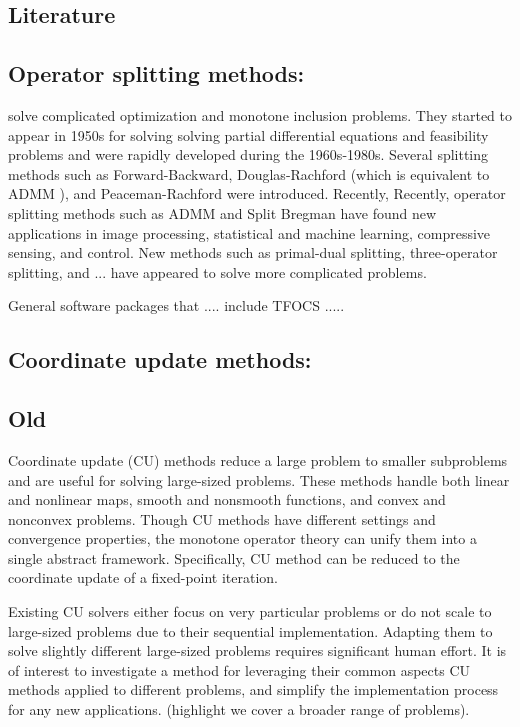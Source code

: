 \subsection{Literature}
\subsection*{Operator splitting methods:}  solve complicated optimization and monotone inclusion problems. They started to appear in 1950s for solving  solving partial differential equations and feasibility problems and were rapidly developed during the 1960s-1980s. Several splitting methods such as Forward-Backward, Douglas-Rachford  (which is equivalent to ADMM \cite{?,?}), and Peaceman-Rachford were introduced. Recently,  Recently,
operator splitting methods such as ADMM and Split Bregman have found new applications in image processing,
statistical and machine learning, compressive sensing, and control. New methods such as primal-dual splitting, three-operator splitting, and ... have appeared to solve more complicated problems.

General software packages that .... include TFOCS .....

\subsection*{Coordinate update methods:}

\subsection{Old}
Coordinate update (CU) methods reduce a large problem to smaller subproblems and are useful for solving large-sized problems.
These methods handle both linear and nonlinear maps, smooth and nonsmooth functions, and convex and nonconvex problems. 
Though CU methods have different settings and convergence properties,  the monotone operator theory can unify them into a single abstract framework. 
Specifically, CU method can be reduced to the coordinate update of a fixed-point iteration. 


Existing CU solvers \citep{hsieh2015passcode,jaggi2014communication,recht2011hogwild} either focus on very particular problems or do not scale to large-sized problems due to their sequential implementation. 
Adapting them to solve slightly different large-sized problems requires significant human effort. 
It is of interest to investigate a method for leveraging their common aspects CU methods applied to different problems, and simplify the implementation process for any new applications. (highlight we cover a broader range of problems).

